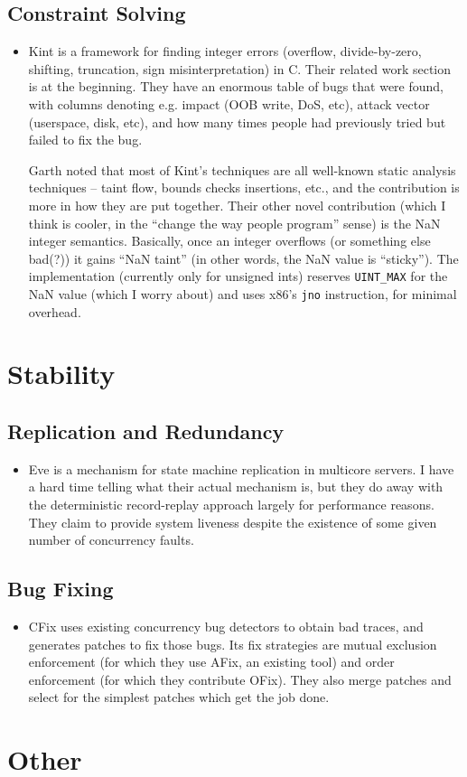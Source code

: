 \documentclass{article}
\begin{document}
\subsection{Constraint Solving}
\begin{itemize}
	\item {\sc Kint} \cite{kint} is a framework for finding integer errors (overflow, divide-by-zero, shifting, truncation, sign misinterpretation) in C. Their related work section is at the beginning. They have an enormous table of bugs that were found, with columns denoting e.g. impact (OOB write, DoS, etc), attack vector (userspace, disk, etc), and how many times people had previously tried but failed to fix the bug.

		Garth noted that most of {\sc Kint}'s techniques are all well-known static analysis techniques -- taint flow, bounds checks insertions, etc., and the contribution is more in how they are put together.
		Their other novel contribution (which I think is cooler, in the ``change the way people program'' sense) is the NaN integer semantics.
		Basically, once an integer overflows (or something else bad(?)) it gains ``NaN taint'' (in other words, the NaN value is ``sticky'').
		The implementation (currently only for unsigned ints) reserves {\tt UINT\_MAX} for the NaN value (which I worry about) and uses x86's {\tt jno} instruction, for minimal overhead.
\end{itemize}


\section{Stability}
\subsection{Replication and Redundancy}
\begin{itemize}
	\item Eve \cite{eve} is a mechanism for state machine replication in multicore servers. I have a hard time telling what their actual mechanism is, but they do away with the deterministic record-replay approach largely for performance reasons. They claim to provide system liveness despite the existence of some given number of concurrency faults.
\end{itemize}

\subsection{Bug Fixing}
\begin{itemize}
	\item CFix \cite{cfix} uses existing concurrency bug detectors to obtain bad traces, and generates patches to fix those bugs. Its fix strategies are mutual exclusion enforcement (for which they use AFix, an existing tool) and order enforcement (for which they contribute OFix). They also merge patches and select for the simplest patches which get the job done.
\end{itemize}


\section{Other}


{}

\end{document}
